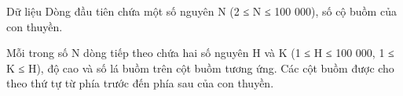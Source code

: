 Dữ liệu
Dòng đầu tiên chứa một số nguyên N (2 ≤ N ≤ 100 000), số cộ buồm của con thuyền.  

   Mỗi trong số N dòng tiếp theo chứa hai số nguyên H và K (1 ≤ H ≤ 100 000, 1 ≤ K ≤ H), độ cao và số lá buồm trên cột buồm tương ứng. Các cột buồm được cho theo thứ tự từ phía trước đến phía sau của con thuyền.